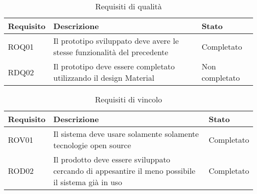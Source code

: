 \begin{table} %
	\centering
	\caption{Requisiti di qualità}
	\label{tab:requisiti-di-qualità}
	\begin{tabular}{|p{3cm}|p{8cm}|p{3cm}|}
		\hline
		Requisito & Descrizione & Stato\\
		\hline
		ROQ01&Il prototipo sviluppato deve avere le stesse funzionalità del precedente&Completato\\
		\hline
		RDQ02&Il prototipo deve essere completato utilizzando il design Material&Non completato\\
		\hline	
	\end{tabular}
\end{table}

\begin{table}
	\centering
	\caption{Requisiti di vincolo}
	\label{tab:requisiti-di-vincolo}
	\begin{tabular}{|p{3cm}|p{8cm}|p{3cm}|}
		\hline
		Requisito & Descrizione & Stato\\
		\hline
		ROV01&Il sistema deve usare solamente solamente tecnologie open source&Completato\\
		\hline
		ROD02&Il prodotto deve essere sviluppato cercando di appesantire il meno possibile il sistema già in uso &Completato\\
		\hline	
	\end{tabular}
\end{table}